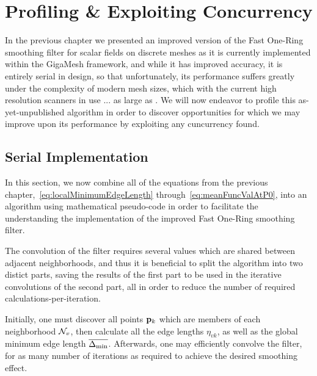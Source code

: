 \chapter{Profiling \& Exploiting Concurrency}
In the previous chapter we presented an improved version of the Fast One-Ring smoothing filter for scalar fields on discrete meshes as it is currently implemented within the GigaMesh framework, and while it has improved accuracy, it is entirely serial in design, so that unfortunately, its performance suffers greatly under the complexity of modern mesh sizes, which with the current high resolution scanners in use ... as large as . We will now endeavor to profile this as-yet-unpublished algorithm in order to discover opportunities for which we may improve upon its performance by exploiting any cuncurrency found.
%
\section{Serial Implementation}
\label{cFPECsSI}
In this section, we now combine all of the equations from the previous chapter,~\ref{eq:localMinimumEdgeLength} through~\ref{eq:meanFuncValAtP0}, into an algorithm using mathematical pseudo-code in order to facilitate the understanding the implementation of the improved Fast One-Ring smoothing filter.

The convolution of the filter requires several values which are shared between adjacent neighborhoods, and thus it is beneficial to split the algorithm into two distict parts, saving the results of the first part to be used in the iterative convolutions of the second part, all in order to reduce the number of required calculations-per-iteration.

Initially, one must discover all points $\mathbf{p}_k$ which are members of each neighborhood $\mathcal{N}_v$, then calculate all the edge lengths $\eta_{vk}$, as well as the global minimum edge length $\overline{\Delta_\text{min}}$. Afterwards, one may efficiently convolve the filter, for as many number of iterations as required to achieve the desired smoothing effect.
%
